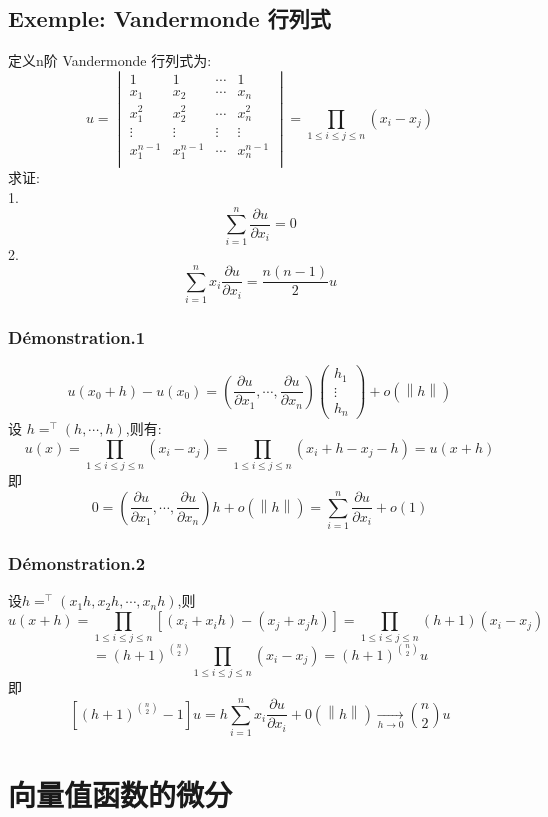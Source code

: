 \documentclass[12pt, a4paper, oneside]{ctexbook}
\begin{document}
  \subsection{Exemple: Vandermonde 行列式}
    定义n阶 Vandermonde 行列式为:
    $$
    u=\begin{vmatrix}
      1 &1   &\cdots & 1 \\
      x_1 &x_2 & \cdots & x_n  \\
      x_1^2 &x_2^2 & \cdots & x_n^2  \\
      \vdots &\vdots & \vdots & \vdots   \\
      x_1^{n-1} & x_1^{n-1} &\cdots &x_n^{n-1} \\
      \end{vmatrix}
      =\prod _{1\leq i\leq j\leq n}(x_i-x_j)
    $$
    求证:\\
    1.
    $$
      \sum_{i = 1}^{n}  \frac{\partial u}{\partial x_i}=0
    $$
    2.
    $$
    \sum_{i = 1}^{n}  x_i \frac{\partial u}{\partial x_i}=\frac{n(n-1)}{2}u
    $$
    \subsubsection{Démonstration.1}
    $$
    u(x_0+h)-u(x_0)=(\frac{\partial u}{\partial x_1},\cdots,\frac{\partial u}{\partial x_n})
    \begin{pmatrix}
      h_1\\
      \vdots\\
      h_n
     \end{pmatrix}+o(\left\lVert h\right\rVert )
    $$
    设 $h=^\top(h,\cdots,h)$,则有:
    $$
    u(x)=\prod _{1\leq i\leq j\leq n}(x_i-x_j)=\prod _{1\leq i\leq j\leq n}(x_i+h-x_j-h)=u(x+h)
    $$
    即
    $$
    0=(\frac{\partial u}{\partial x_1},\cdots,\frac{\partial u}{\partial x_n})h+o(\left\lVert h\right\rVert )=\sum_{i = 1}^{n}  \frac{\partial u}{\partial x_i}+o(1)
    $$
    \subsubsection{Démonstration.2}
    设$h=^\top(x_1h,x_2h,\cdots,x_nh)$,则
    $$
    u(x+h)=\prod _{1\leq i\leq j\leq n}[(x_i+x_ih)-(x_j+x_jh)]=\prod _{1\leq i\leq j\leq n}(h+1)(x_i-x_j)
    $$
    $$
    =(h+1)^{\binom{n}{2} }\prod _{1\leq i\leq j\leq n}(x_i-x_j)=(h+1)^{\binom{n}{2} }u
    $$
    即
    $$
    [(h+1)^{\binom{n}{2} }-1]u=h\sum_{i = 1}^{n}  x_i \frac{\partial u}{\partial x_i}+0(\left\lVert h\right\rVert )\xrightarrow[h\rightarrow 0]{}{\binom{n}{2} }u
    $$
\section{向量值函数的微分}
\end{document}
